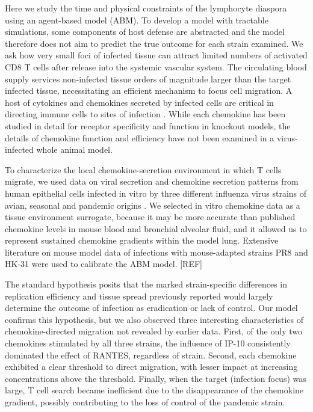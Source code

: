 \documentclass[10pt]{article}
\begin{document}
Here we study the time and physical constraints of the lymphocyte diaspora using an agent-based model (ABM).  To develop a model with tractable simulations, some components of host defense are abstracted and the model therefore does not aim to predict the true outcome for each strain examined.   We ask how very small foci of infected tissue can attract limited numbers of activated CD8 T cells after release into the systemic vascular system.  The circulating blood supply services non-infected tissue orders of magnitude larger than the target infected tissue, necessitating an efficient mechanism to focus cell migration.   A host of cytokines and chemokines secreted by infected cells are critical in directing immune cells to sites of infection \cite{Miao2010, Zhao2000, LiJeon2002}.  While each chemokine has been studied in detail for receptor specificity and function in knockout models, the details of chemokine function and efficiency have not been examined in a virus-infected whole animal model.  

To characterize the local chemokine-secretion environment in which T cells migrate, we used data on viral secretion and chemokine secretion patterns from human epithelial cells infected in vitro by three different influenza virus strains of avian, seasonal and pandemic origins \cite{Mitchell2011}.   We selected in vitro chemokine data as a tissue environment surrogate, because it may be more accurate than published chemokine levels in mouse blood and bronchial alveolar fluid, and it allowed us to represent sustained chemokine gradients within the model lung.  Extensive literature on mouse model data of infections with mouse-adapted strains PR8 and HK-31 were used to calibrate the ABM model. [REF]

The standard hypothesis posits that the marked strain-specific differences in replication efficiency and tissue spread previously reported \cite{Mitchell2011} would largely determine the outcome of infection as eradication or lack of control.  Our model confirms this hypothesis, but we also observed three interesting characteristics of chemokine-directed migration not revealed by earlier data.  First, of the only two chemokines stimulated by all three strains, the influence of IP-10 consistently dominated the effect of RANTES, regardless of strain.  Second, each chemokine exhibited a clear threshold to direct migration, with lesser impact at increasing concentrations above the threshold.  Finally, when the target (infection focus) was large, T cell search became inefficient due to the disappearance of the chemokine gradient, possibly contributing to the loss of control of the pandemic strain.  
\end{document}
